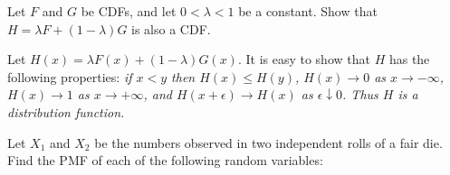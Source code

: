\begin{exercise}
\begin{questions}
\question
Let $F$ and $G$ be CDFs, and let $0<\lambda<1$ be a constant. Show that $H = \lambda F + (1-\lambda)G$ is also a CDF.
\begin{answer}
Let $H(x) = \lambda F(x) + (1-\lambda)G(x)$. It is easy to show that $H$ has the following properties:
\bit
\it if $x < y$ then $H(x) \leq H(y)$,
\it $H(x)\to 0$ as $x\to-\infty$,
\it $H(x)\to 1$ as $x\to+\infty$, and
\it $H(x+\epsilon)\to H(x)$ as $\epsilon\downarrow 0$.
\eit
Thus $H$ is a distribution function.
\end{answer}

\question
Let $X_1$ and $X_2$ be the numbers observed in two independent rolls of a fair die. Find the PMF of each of the following random variables:
\begin{parts}

\end{parts}
\end{questions}
\end{exercise}
